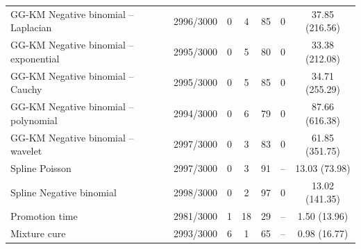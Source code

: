 \begin{table}[p]
{\begin{tabular}{lcccccc}
GG-KM Negative binomial -- Laplacian
& 2996/3000 & 0 & 4 & 85 & 0 & 37.85 (216.56) \\

GG-KM Negative binomial -- exponential
& 2995/3000 & 0 & 5 & 80 & 0 & 33.38 (212.08) \\

GG-KM Negative binomial -- Cauchy
& 2995/3000 & 0 & 5 & 85 & 0 & 34.71 (255.29) \\

GG-KM Negative binomial -- polynomial
& 2994/3000 & 0 & 6 & 79 & 0 & 87.66 (616.38) \\

GG-KM Negative binomial -- wavelet
& 2997/3000 & 0 & 3 & 83 & 0 & 61.85 (351.75) \\

\hline

Spline Poisson
& 2997/3000 & 0 & 3 & 91 & -- & 13.03 (73.98) \\

Spline Negative binomial
& 2998/3000 & 0 & 2 & 97 & 0 & 13.02 (141.35) \\

Promotion time
& 2981/3000 & 1 & 18 & 29 & -- & 1.50 (13.96) \\

Mixture cure
& 2993/3000 & 6 & 1 & 65 & -- & 0.98 (16.77) \\

\hline
\end{tabular}%
}
\end{table}

